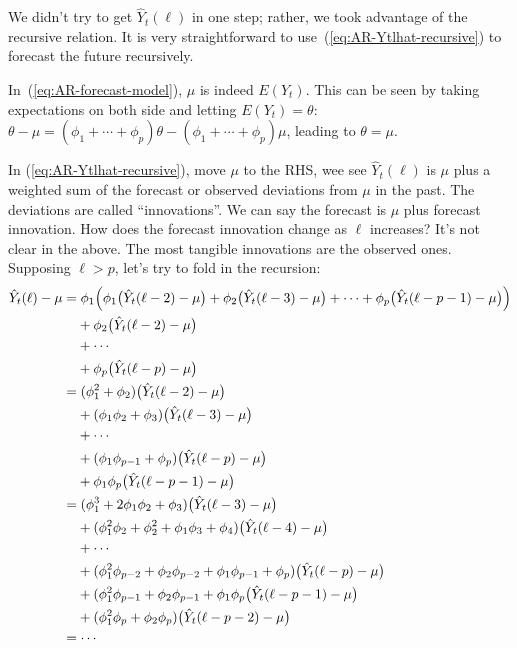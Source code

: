 \documentclass[12pt]{article}
\begin{document}
\alert
We didn't try to get $\hat{Y}_t(\ell)$ in one step;
rather, we took advantage of the recursive relation.
It is very straightforward to use~(\ref{eq:AR-Ytlhat-recursive})
to forecast the future recursively.

\alert
In~(\ref{eq:AR-forecast-model}),
$\mu$ is indeed $E(Y_t)$.
This can be seen by taking expectations on both side and letting
$E(Y_t) = \theta$:
$\theta - \mu = (\phi_1 +\dotsb +\phi_p) \theta - (\phi_1 +\dotsb +
\phi_p)\mu$,
leading to $\theta = \mu$.

In (\ref{eq:AR-Ytlhat-recursive}), move $\mu$ to the RHS, wee see
$\hat{Y}_t(\ell)$ is $\mu$ plus a weighted sum of the
forecast or observed deviations from $\mu$ in the past.
The deviations are called ``innovations''.
We can say the forecast is $\mu$ plus forecast innovation.
How does the forecast innovation change as $\ell$ increases?
It's not clear in the above.
The most tangible innovations are the observed ones.
Supposing $\ell > p$,
let's try to fold in the recursion:
\[
\begin{split}
\hat{Y}_t(\ell) - \mu
&= \phi_1
        \Bigl(
            \phi_1 \bigl(\hat{Y}_t(\ell-2) - \mu\bigr) +
            \phi_2 \bigl(\hat{Y}_t(\ell-3) - \mu\bigr)
            +\dotsb + \phi_p \bigl(\hat{Y}_t(\ell-p-1) - \mu\bigr)
        \Bigr)
\\
&\phantom{\mathrel{=}\;}
    + \phi_2 \bigl(\hat{Y}_t(\ell-2) - \mu\bigr)
\\
&\phantom{\mathrel{=}\;}
    + \dotsb
\\
&\phantom{\mathrel{=}\;}
    + \phi_p \bigl(\hat{Y}_t(\ell-p) - \mu\bigr)
\\
&=
    (\phi_1^2 + \phi_2) \bigl(\hat{Y}_t(\ell-2) - \mu\bigr)
\\
&\phantom{\mathrel{=}\;}
    + (\phi_1\phi_2 + \phi_3) \bigl(\hat{Y}_t(\ell-3) - \mu\bigr)
\\
&\phantom{\mathrel{=}\;}
    + \dotsb
\\
&\phantom{\mathrel{=}\;}
    + (\phi_1\phi_{p-1} + \phi_p) \bigl(\hat{Y}_t(\ell-p) - \mu\bigr)
\\
&\phantom{\mathrel{=}\;}
    + \phi_1\phi_p \bigl(\hat{Y}_t(\ell-p-1) - \mu\bigr)
\\
&=
    (\phi_1^3 + 2\phi_1\phi_2 + \phi_3) \bigl(\hat{Y}_t(\ell-3) - \mu\bigr)
\\
&\phantom{\mathrel{=}\;}
    + (\phi_1^2\phi_2 + \phi_2^2 + \phi_1\phi_3 + \phi_4) \bigl(\hat{Y}_t(\ell-4) - \mu\bigr)
\\
&\phantom{\mathrel{=}\;}
    + \dotsb
\\
&\phantom{\mathrel{=}\;}
    + (\phi_1^2\phi_{p-2} + \phi_2\phi_{p-2} + \phi_1\phi_{p-1} + \phi_p)
        \bigl(\hat{Y}_t(\ell-p) - \mu\bigr)
\\
&\phantom{\mathrel{=}\;}
    + (\phi_1^2\phi_{p-1} + \phi_2\phi_{p-1} + \phi_1\phi_p
        \bigl(\hat{Y}_t(\ell-p-1) - \mu\bigr)
\\
&\phantom{\mathrel{=}\;}
    + (\phi_1^2\phi_p + \phi_2\phi_p)
        \bigl(\hat{Y}_t(\ell-p-2) - \mu\bigr)
\\
&= \dotsb
\end{split}
\]
\end{document}
